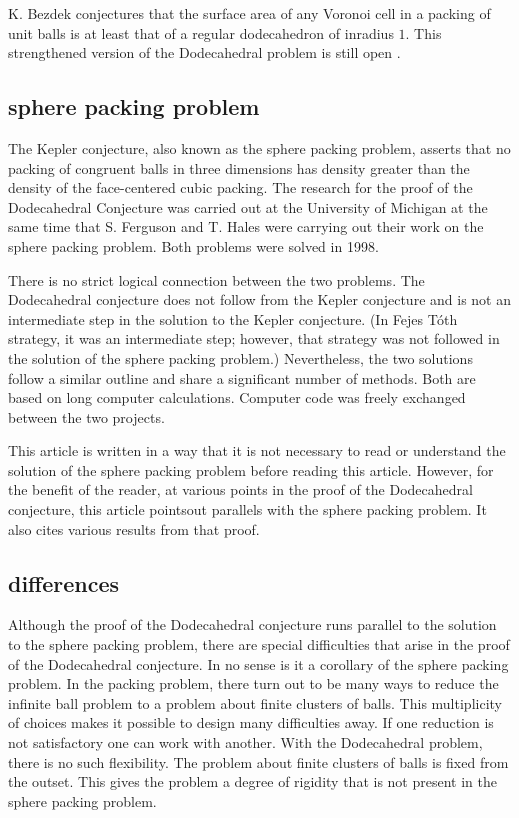 K. Bezdek conjectures that the surface area of any Voronoi cell in a packing
of unit balls is at least that of a regular dodecahedron of inradius $1$.
This strengthened version of the Dodecahedral problem is still
open \cite{Bez04}.   



\subsection{sphere packing problem}

The Kepler conjecture, also known as the sphere packing problem, 
asserts that no packing of congruent balls
in three dimensions has density greater than the density of the
face-centered cubic packing.  
The research for the proof of the Dodecahedral Conjecture 
was carried out at the University
of Michigan at the same time that S. Ferguson and T. Hales were
carrying out their work on the sphere packing problem.  Both
problems were solved in 1998.  

There is no strict logical connection between the two problems.
The Dodecahedral conjecture does not follow from the Kepler conjecture
and is not an intermediate step in the solution to the Kepler conjecture.
(In Fejes T\'oth strategy, it was an intermediate step; however, that
strategy was not followed in the solution of the sphere packing problem.)
Nevertheless,
the two solutions follow a similar outline and share a significant number of 
methods.
Both are based 
on long computer calculations.  Computer
code was freely exchanged between the two projects.

This article is written in a way that it is not necessary to
read or understand the solution of the sphere packing problem before
reading this article.  However, for the benefit of the reader,
at various points in the proof
of the Dodecahedral conjecture, this article pointsout
parallels with the sphere packing problem.  It also cites various results
from that proof.



\subsection{differences}

Although the proof of the Dodecahedral conjecture runs parallel
to the solution to the sphere packing problem, there are special
difficulties that arise in the proof of the Dodecahedral conjecture.
In no sense is it a corollary of the sphere packing problem.
In the packing problem, there turn out to be many ways to
reduce the infinite ball problem to a problem about finite clusters
of balls.  This multiplicity of choices makes it
possible to design many difficulties away.  If one reduction is
not satisfactory one can work with
another.
With the Dodecahedral problem, there is no such flexibility.
The problem about finite clusters of balls is fixed from the outset.
This gives the problem a degree of rigidity that is not present
in the sphere packing problem.


